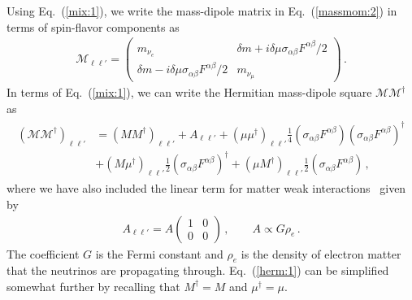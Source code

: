 \documentclass[addchapnum]{ws-rv961x669} %
\newcommand{\req}[1]{Eq.~(\ref{#1})}
\begin{document}
Using \req{mix:1}, we write the mass-dipole matrix in \req{massmom:2} in terms of spin-flavor components as
\begin{align}
	\label{mix:2}
    \mathcal{M}_{\ell\ell'} = 
	\begin{pmatrix}
		m_{\nu_{e}} & {\delta m}+i\delta\mu\sigma_{\alpha\beta}F^{\alpha\beta}/2\\
		{\delta m}-i\delta\mu\sigma_{\alpha\beta}F^{\alpha\beta}/2 & m_{\nu_{\mu}}
	\end{pmatrix}\,.
\end{align}
In terms of \req{mix:1}, we can write the Hermitian mass-dipole square $\mathcal{M}\mathcal{M}^{\dag}$ as
\begin{align}
    \label{herm:1}
    \begin{split}
        (\mathcal{M}\mathcal{M}^{\dag})_{\ell\ell'}
        &=(MM^{\dag})_{\ell\ell'}+A_{\ell\ell'}+(\mu\mu^{\dag})_{\ell\ell'}\frac{1}{4}\left(\sigma_{\alpha\beta}F^{\alpha\beta}\right)\left(\sigma_{\alpha\beta}F^{\alpha\beta}\right)^{\dag}\\
        &+(M\mu^{\dag})_{\ell\ell'}\frac{1}{2}\left(\sigma_{\alpha\beta}F^{\alpha\beta}\right)^{\dag}
        +(\mu M^{\dag})_{\ell\ell'}\frac{1}{2}\left(\sigma_{\alpha\beta}F^{\alpha\beta}\right)\,,        
    \end{split}
\end{align}
where we have also included the linear term for matter weak interactions~\cite{Wolfenstein:1977ue} given by
\begin{align}
    \label{matter:1}
    A_{\ell\ell'}=A
    \begin{pmatrix}
        1 & 0\\
        0 & 0
    \end{pmatrix}\,,\qquad
    A\propto G\rho_{e}\,.
\end{align}
The coefficient $G$ is the Fermi constant and $\rho_{e}$ is the density of electron matter that the neutrinos are propagating through. \req{herm:1} can be simplified somewhat further by recalling that $M^{\dag}=M$ and $\mu^{\dag}=\mu$.
\end{document}
